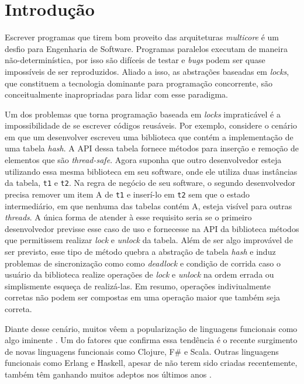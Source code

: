 \chapter{Introdução}

Escrever programas que tirem bom proveito das arquiteturas \emph{multicore} é um desfio para Engenharia de Software. Programas paralelos executam de maneira não-determinística, por isso são difíceis de testar e \emph{bugs} podem ser quase impossíveis de ser reproduzidos. Aliado a isso, as abstrações baseadas em \emph{locks}, que constituem a tecnologia dominante para programação concorrente, são conceitualmente inapropriadas para lidar com esse paradigma. \cite{jones2007beautiful}

Um dos problemas que torna programação baseada em \emph{locks} impraticável é a impossibilidade de se escrever códigos reusáveis. Por exemplo, considere o cenário em que um desenvolver escreveu uma biblioteca que contém a implementação de uma tabela \emph{hash}. A API dessa tabela fornece métodos para inserção e remoção de elementos que são \emph{thread-safe}. Agora suponha que outro desenvolvedor esteja utilizando essa mesma biblioteca em seu software, onde ele utiliza duas instâncias da tabela, \verb|t1| e \verb|t2|. Na regra de negócio de seu software, o segundo desenvolvedor precisa remover um item A de \verb|t1| e inserí-lo em \verb|t2| sem que o estado intermediário, em que nenhuma das tabelas contém A, esteja visível para outras \emph{threads}. A única forma de atender à esse requisito seria se o primeiro desenvolvedor previsse esse caso de uso e fornecesse na API da biblioteca métodos que permitissem realizar \emph{lock} e \emph{unlock} da tabela. Além de ser algo improvável de ser previsto, esse 
tipo de método quebra a abstração de tabela \emph{hash} e induz problemas de sincronização como como \emph{deadlock} e condição de corrida caso o usuário da biblioteca realize operações de \emph{lock} e \emph{unlock} na ordem errada ou simplismente esqueça de realizá-las. Em resumo, operações indiviualmente corretas não podem ser compostas em uma operação maior que também seja correta. \cite{harris2005composable}

Diante desse cenário, muitos vêem a popularização de linguagens funcionais como algo iminente \cite{theeconomist}. Um do fatores que confirma essa tendência é o recente surgimento de novas linguagens funcionais como Clojure, F\# e Scala. Outras linguagens funcionais como Erlang e Haskell, apesar de não terem sido criadas recentemente, também têm ganhando muitos adeptos nos últimos anos \cite{ycombinator}.


